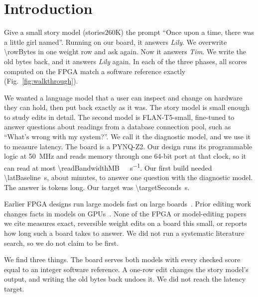 \documentclass[conference,10pt,letterpaper]{IEEEtran}
\newcommand{\seconds}[1]{\SI{#1}{\second}}
\newcommand{\pynq}{\mbox{PYNQ-Z2}}
\newcommand{\flan}{\mbox{FLAN-T5-small}}
\newcommand{\stories}{\mbox{stories260K}}
\begin{document}
\section{Introduction}

Give a small story model (\stories) the prompt ``Once upon a time, there was a little girl named''. Running on our board, it answers \emph{Lily}. We overwrite \SI{\rowBytes}{\byte} in one weight row and ask again. Now it answers \emph{Tim}. We write the old bytes back, and it answers \emph{Lily} again. In each of the three phases, all \walkPhaseScores{} scores computed on the FPGA match a software reference exactly (Fig.~\ref{fig:walkthrough}).

We wanted a language model that a user can inspect and change on hardware they can hold, then put back exactly as it was. The story model is small enough to study edits in detail. The second model is \flan, fine-tuned to answer questions about readings from a database connection pool, such as ``What's wrong with my system?''. We call it the diagnostic model, and we use it to measure latency. The board is a \pynq. Our design runs its programmable logic at \SI{50}{\mega\hertz} and reads memory through one 64-bit port at that clock, so it can read at most \SI{\readBandwidthMB}{\mega\byte\per\second}. Our first build needed \seconds{\latBaseline}, about \latBaselineMinutes{} minutes, to answer one question with the diagnostic model. The answer is \decoderSteps{} tokens long. Our target was \seconds{\targetSeconds}.

Earlier FPGA designs run large models fast on large boards~\cite{zeng2024flightllm,hong2022dfx,xu2024llamaf}. Prior editing work changes facts in models on GPUs~\cite{meng2022rome,meng2023memit}. None of the FPGA or model-editing papers we cite measures exact, reversible weight edits on a board this small, or reports how long such a board takes to answer. We did not run a systematic literature search, so we do not claim to be first.

We find three things. The board serves both models with every checked score equal to an integer software reference. A one-row edit changes the story model's output, and writing the old bytes back undoes it. We did not reach the latency target.
\end{document}
